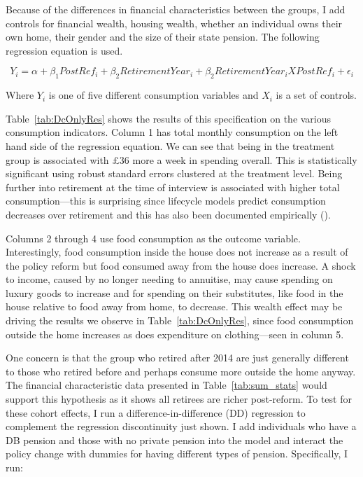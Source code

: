 \documentclass[12pt]{article}
\begin{document}
Because of the differences in financial characteristics between the groups, I
add controls for financial wealth, housing wealth, whether an individual owns
their own home, their gender and the size of their state pension. The following
regression equation is used.

\begin{equation*}
  \label{eq:main-rd}
  Y_{i} = \alpha + \beta_{1} PostRef_{i} + \beta_{2} RetirementYear_{i}  + \beta_{2} RetirementYear_{i} X PostRef_{i}  + \epsilon_{i}
\end{equation*}

Where $Y_{i}$ is one of five different consumption variables and $X_{i}$ is
a set of controls.

Table~\ref{tab:DcOnlyRes} shows the results of this specification on the various
consumption indicators. Column 1 has total monthly consumption on the left hand
side of the regression equation. We can see that being in the treatment group is
associated with £36 more a week in spending overall. This is statistically
significant using robust standard errors clustered at the treatment level. Being
further into retirement at the time of interview is associated with higher total
consumption---this is surprising since lifecycle models predict consumption
decreases over retirement and this has also been documented empirically
(\cite{hurd-rohwedder-nber-2003}).

Columns 2 through 4 use food consumption as the outcome variable. Interestingly,
food consumption inside the house does not increase as a result of the policy
reform but food consumed away from the house does increase. A shock to income,
caused by no longer needing to annuitise, may cause spending on luxury goods to
increase and for spending on their substitutes, like food in the house relative
to food away from home, to decrease. This wealth effect may be driving the
results we observe in Table~\ref{tab:DcOnlyRes}, since food consumption outside the
home increases as does expenditure on clothing---seen in column 5.

One concern is that the group who retired after 2014 are just generally
different to those who retired before and perhaps consume more outside the home
anyway. The financial characteristic data presented in Table~\ref{tab:sum_stats}
would support this hypothesis as it shows all retirees are richer post-reform.
To test for these cohort effects, I run a difference-in-difference (DD)
regression to complement the regression discontinuity just shown. I add
individuals who have a DB pension and those with no private pension into the
model and interact the policy change with dummies for having different types of
pension. Specifically, I run:
\end{document}
